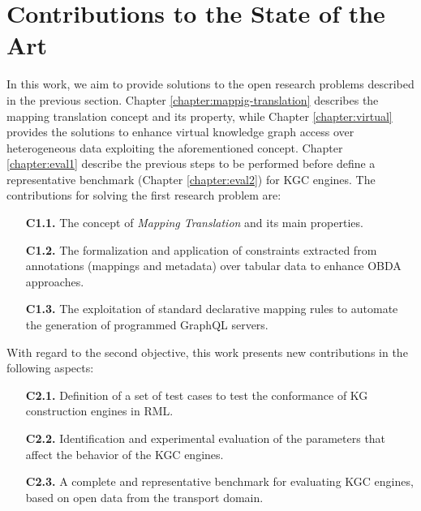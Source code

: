 \section{Contributions to the State of the Art}
In this work, we aim to provide solutions to the open research problems described in the previous section. Chapter \ref{chapter:mappig-translation} describes the mapping translation concept and its property, while Chapter \ref{chapter:virtual} provides the solutions to enhance virtual knowledge graph access over heterogeneous data exploiting the aforementioned concept. Chapter \ref{chapter:eval1} describe the previous steps to be performed before define a representative benchmark (Chapter \ref{chapter:eval2}) for KGC engines. The contributions for solving the first research problem are:

\begin{enumerate}
    \item[\textbf{C1.1.}] The concept of \textit{Mapping Translation} and its main properties. 
    \item[\textbf{C1.2.}] The formalization and application of constraints extracted from annotations (mappings and metadata) over tabular data to enhance OBDA approaches. 
    \item[\textbf{C1.3.}] The exploitation of standard declarative mapping rules to automate the generation of programmed GraphQL servers. 
\end{enumerate}

With regard to the second objective, this work presents new contributions in the following aspects:
\begin{enumerate}
    \item[\textbf{C2.1.}] Definition of a set of test cases to test the conformance of KG construction engines in RML.
    \item[\textbf{C2.2.}] Identification and experimental evaluation of the parameters that affect the behavior of the KGC engines. 
    \item[\textbf{C2.3.}] A complete and representative benchmark for evaluating KGC engines, based on open data from the transport domain.
\end{enumerate}

